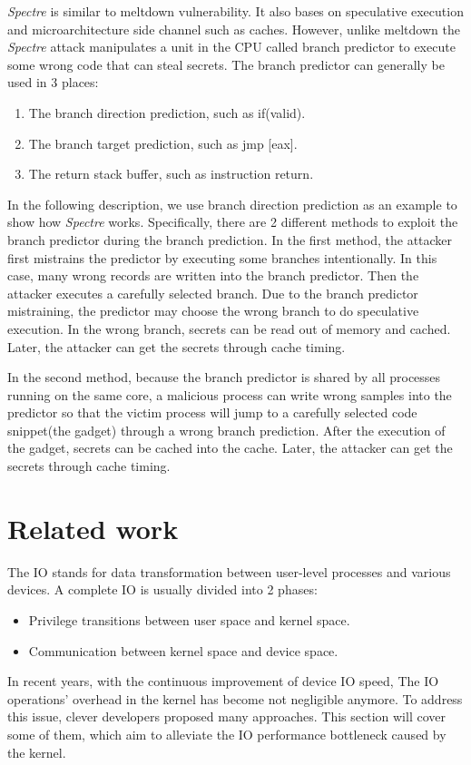 \emph{Spectre}\cite{4} is similar to meltdown vulnerability. It also bases on speculative 
execution and microarchitecture side channel such as caches. However, unlike meltdown the 
\emph{Spectre} attack manipulates a unit in the CPU called branch predictor to execute some wrong 
code that can steal secrets.  The branch predictor can generally be used in 3 places\cite{5}:



\begin{enumerate}
  \item The branch direction prediction,  such as if(valid).
  \item The branch target prediction, such as jmp [eax].
  \item The return stack buffer, such as instruction return.
\end{enumerate}
In the following description, we use branch direction prediction as an example to show 
how \emph{Spectre} works.  Specifically, there are 2 different methods to exploit the branch 
predictor during the branch prediction.  In the first method, the attacker first mistrains 
the predictor by executing some branches intentionally.  In this case, many wrong records 
are written into the branch predictor. Then the attacker executes a carefully selected branch. 
Due to the branch predictor mistraining, the predictor may choose the wrong branch to do 
speculative execution.  In the wrong branch, secrets can be read out of memory and cached. 
Later, the attacker can get the secrets through cache timing\cite{11}.

In the second method, 
because the branch predictor is shared by all processes running on the same core, 
a malicious process can write wrong samples into the predictor so that the victim process will 
jump to a carefully selected code snippet(the gadget) through a wrong branch prediction. 
After the execution of the gadget, secrets can be cached into the cache. Later, the attacker 
can get the secrets through cache timing.

\section{Related work}
The IO stands for data transformation between user-level processes 
and various devices. A complete IO is usually divided into 2 phases:
\begin{itemize}
  \item Privilege transitions between user space and kernel space.
  \item Communication between kernel space and device space.
\end{itemize}  
In recent years, with the continuous improvement of device IO speed, 
The IO operations' overhead in the kernel has become not negligible anymore. 
To address this issue, clever developers proposed many approaches. 
This section will cover some of them, which aim to alleviate the IO 
performance bottleneck caused by the kernel.

